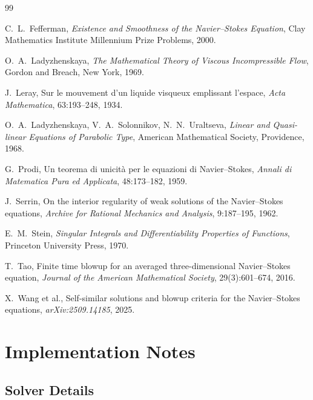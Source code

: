 \documentclass[11pt]{article}
\theoremstyle{definition}
\theoremstyle{remark}
\begin{document}
\begin{thebibliography}{99}

  C.~L.~Fefferman,
  \emph{Existence and Smoothness of the Navier--Stokes Equation},
  Clay Mathematics Institute Millennium Prize Problems, 2000.

  O.~A.~Ladyzhenskaya,
  \emph{The Mathematical Theory of Viscous Incompressible Flow},
  Gordon and Breach, New York, 1969.

  J.~Leray,
  Sur le mouvement d'un liquide visqueux emplissant l'espace,
  \emph{Acta Mathematica}, 63:193--248, 1934.

  O.~A.~Ladyzhenskaya, V.~A.~Solonnikov, N.~N.~Uraltseva,
  \emph{Linear and Quasi-linear Equations of Parabolic Type},
  American Mathematical Society, Providence, 1968.

  G.~Prodi,
  Un teorema di unicità per le equazioni di Navier--Stokes,
  \emph{Annali di Matematica Pura ed Applicata}, 48:173--182, 1959.

  J.~Serrin,
  On the interior regularity of weak solutions of the Navier--Stokes equations,
  \emph{Archive for Rational Mechanics and Analysis}, 9:187--195, 1962.

  E.~M.~Stein,
  \emph{Singular Integrals and Differentiability Properties of Functions},
  Princeton University Press, 1970.

  T.~Tao,
  Finite time blowup for an averaged three-dimensional Navier--Stokes equation,
  \emph{Journal of the American Mathematical Society}, 29(3):601--674, 2016.

  X.~Wang et al.,
  Self-similar solutions and blowup criteria for the Navier--Stokes equations,
  \emph{arXiv:2509.14185}, 2025.

\end{thebibliography}

\appendix
\section{Implementation Notes}
\label{app:impl}

\subsection{Solver Details}
\end{document}
